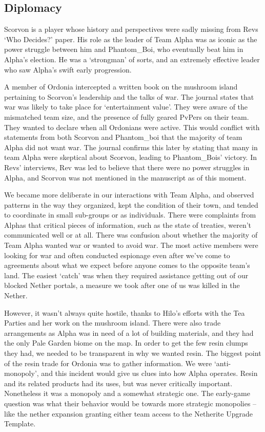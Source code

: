 \subsection{Diplomacy}
Scorvon is a player whose history and perspectives were sadly missing from Revs `Who Decides?' paper. His role as the leader of Team Alpha was as iconic as the power struggle between him and Phantom\_Boi, who eventually beat him in Alpha's election. He was a `strongman' of sorts, and an extremely effective leader who saw Alpha's swift early progression.

A member of Ordonia intercepted a written book on the mushroom island pertaining to Scorvon's leadership and the talks of war. The journal states that war was likely to take place for `entertainment value'. They were aware of the mismatched team size, and the presence of fully geared PvPers on their team. They wanted to declare when all Ordonians were active. This would conflict with statements from both Scorvon and Phantom\_boi that the majority of team Alpha did not want war. The journal confirms this later by stating that many in team Alpha were skeptical about Scorvon, leading to Phantom\_Bois' victory. In Revs' interviews, Rev was led to believe that there were no power struggles in Alpha, and Scorvon was not mentioned in the manuscript as of this moment.~\citep{Rev(2026)}

We became more deliberate in our interactions with Team Alpha, and observed patterns in the way they organized, kept the condition of their town, and tended to coordinate in small sub-groups or as individuals. There were complaints from Alphas that critical pieces of information, such as the state of treaties, weren't communicated well or at all. There was confusion about whether the majority of Team Alpha wanted war or wanted to avoid war. The most active members were looking for war and often conducted espionage even after we've come to agreements about what we expect before anyone comes to the opposite team's land. The easiest `catch' was when they required assistance getting out of our blocked Nether portals, a measure we took after one of us was killed in the Nether.

However, it wasn't always quite hostile, thanks to Hilo's efforts with the Tea Parties and her work on the mushroom island. There were also trade arrangements as Alpha was in need of a lot of building materials, and they had the only Pale Garden biome on the map. In order to get the few resin clumps they had, we needed to be transparent in why we wanted resin. The biggest point of the resin trade for Ordonia was to gather information. We were `anti-monopoly', and this incident would give us clues into how Alpha operates. Resin and its related products had its uses, but was never critically important. Nonetheless it was a monopoly and a somewhat strategic one. The early-game question was what their behavior would be towards more strategic monopolies – like the nether expansion granting either team access to the Netherite Upgrade Template.

